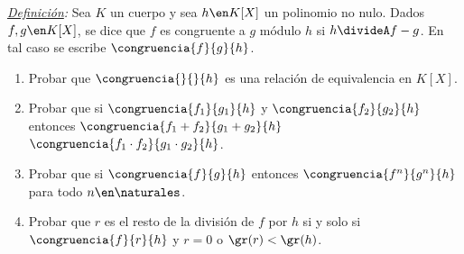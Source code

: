 \begin{enunciado}{\ejercicio}

  \textit{\underline {Definición}:} Sea $K$ un cuerpo y sea $h \en K[X]$ un polinomio no nulo. Dados $f,g \en K[X]$,
  se dice que $f$ es congruente a $g$ módulo $h$ si $h \divideA f-g$. En tal caso se escribe $\congruencia{f}{g}{h}$.

  \begin{enumerate}[label=\roman*)]
    \item Probar que $\congruencia{}{}{h}$ es una relación de equivalencia en $K[X]$.

    \item Probar que si
          $\congruencia{f_1}{g_1}{h}$ y
          $\congruencia{f_2}{g_2}{h}$
          entonces
          $\congruencia{f_1 + f_2}{g_1 + g_2}{h}$
          $\congruencia{f_1 \cdot f_2}{ g_1 \cdot g_2}{h}$.

    \item Probar que si $\congruencia{f}{g}{h}$ entonces $\congruencia{f^n}{g^n}{h}$ para todo $n \en \naturales$.

    \item Probar que $r$ es el resto de la división de $f$ por $h$ si y solo si $\congruencia{f}{r}{h}$ y $r=0$ o $\gr(r) < \gr(h)$.
  \end{enumerate}

\end{enunciado}

